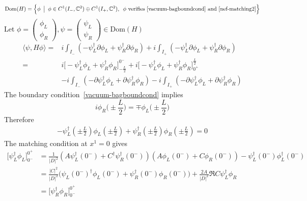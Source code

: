 \begin{equation*}
\mathrm{Dom}(H) = \Big \{\phi \enskip \big\vert \enskip \phi \in C^{1}(I_-, \mathbb{C}^2) \oplus C^{1}(I_+, \mathbb{C}^2), \enskip \phi \textrm{ verifies~\cref{vacuum-bagboundcond} and~\cref{nef-matching2}} \Big \}
\end{equation*} 
Let $ \phi = \begin{pmatrix} \phi_L \\ \phi_R \end{pmatrix}, \psi = \begin{pmatrix} \psi_L \\ \psi_R \end{pmatrix} \in \mathrm{Dom}(H)$
\begin{equation}\label{sa-hamiltonian}
\begin{split}
\langle \psi, H \phi \rangle = & i \int_{I_-} ( - \psi_L^\dagger \partial \phi_L + \psi_R^\dagger \partial \phi_R )
+ i \int_{I_+} ( - \psi_L^\dagger \partial \phi_L + \psi_R^\dagger \partial \phi_R ) \\
= & i \big[-\psi_L^\dagger \phi_L + \psi_R^\dagger \phi_R \big]^{0^-}_{-\frac{L}{2}} + i \big[-\psi_L^\dagger \phi_L + \psi_R^\dagger \phi_R \big]_{0^+}^{\frac{L}{2}} \\
& - i \int_{I_-} ( - \partial \psi_L^\dagger \phi_L + \partial \psi_R^\dagger  \phi_R ) - i \int_{I_+} ( - \partial \psi_L^\dagger \phi_L + \partial \psi_R^\dagger  \phi_R ) 
\end{split}
\end{equation}
The boundary condition~\cref{vacuum-bagboundcond} implies
\begin{equation*}
i\phi_R \big(\pm \frac L 2) = \mp\phi_L\big(\pm\frac L 2\big)
\end{equation*}
Therefore
\begin{equation*}
\begin{split}
- \psi_L^\dagger(\pm \frac{L}{2}) \phi_L(\pm \frac{L}{2}) + \psi_R^\dagger(\pm \frac{L}{2}) \phi_R(\pm \frac{L}{2}) = 
0
\end{split}
\end{equation*}
The matching condition at $x^1 = 0$ gives
\begin{equation*}
\begin{split}
\big[ \psi^\dagger_L\phi_L] ^{0^+}_{0^-} & = \frac{1}{|D|^2}(A \psi_L^\dagger(0^-) + C^\dagger\psi^\dagger_R(0^-))(A \phi_L(0^-) + C\phi_R(0^-)) - \psi^\dagger_L(0^-)\phi^\dagger_L(0^-) \\
& = \frac{|C|^2}{|D|^2}\big(\psi_L(0^-)^\dagger\phi_L(0^-) + \psi_R^\dagger(0^-) \phi_R(0^-)\big) +
\frac{2A}{|D|^2}\Re{C\psi_L^\dagger \phi_R} \\
& = \big[ \psi^\dagger_R\phi_R] ^{0^+}_{0^-}
\end{split}
\end{equation*}

